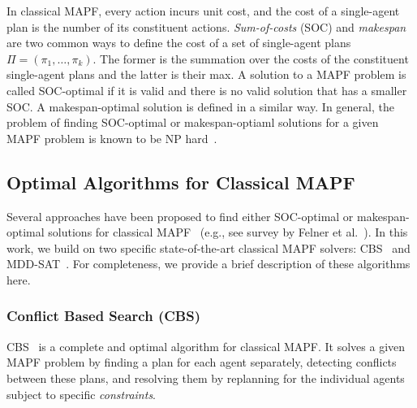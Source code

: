 \documentclass[review]{elsarticle}
\newcommand\konstantin[1]{\nb{\textbf{Konstantin:}}{red}{#1}}
\newcommand\roni[1]{\nb{\textbf{Roni:}}{green}{#1}}
\newcommand{\cbs}{\ac{CBS}\xspace}
\newcommand{\mddsat}{MDD-SAT\xspace}
\newcommand{\mapf}{\ac{MAPF}\xspace}
\begin{document}
In classical MAPF, every action incurs unit cost, 
and the cost of a single-agent plan is the number of its constituent actions. 
\emph{Sum-of-costs} (SOC) and \emph{makespan} are two common ways to define the cost of a set of single-agent plans $\Pi=(\pi_1,\ldots, \pi_k)$. The former is the summation over the costs of the constituent single-agent plans and the latter is their max. A solution to a \mapf problem is called SOC-optimal if it is valid and there is no valid solution that has a smaller SOC. A makespan-optimal solution is defined in a similar way. 
In general, the problem of finding SOC-optimal or makespan-optiaml solutions for a given \mapf problem is known to be NP hard~\cite{yu2013multi,surynek2010optimization}.



\subsection{Optimal Algorithms for Classical \mapf}
Several approaches have been proposed to find either SOC-optimal or makespan-optimal solutions for classical \mapf~ 
(e.g., see survey by Felner et al.~\cite{felner2017searchBased}). 
In this work, we build on two specific state-of-the-art classical \mapf solvers: \cbs~\cite{sharon2015conflict} and  \mddsat~\cite{DBLP:conf/ecai/SurynekFSB16}. 
For completeness, we provide a brief description of these algorithms here. 

\subsubsection{Conflict Based Search (CBS)}
\label{sec:cbs}

\cbs~\cite{sharon2015conflict} is a complete and optimal algorithm for classical \mapf. 
It solves a given \mapf problem by finding a plan for each agent separately, detecting conflicts between these plans, and resolving them by replanning for the individual agents subject to specific \emph{constraints}. 
\end{document}
